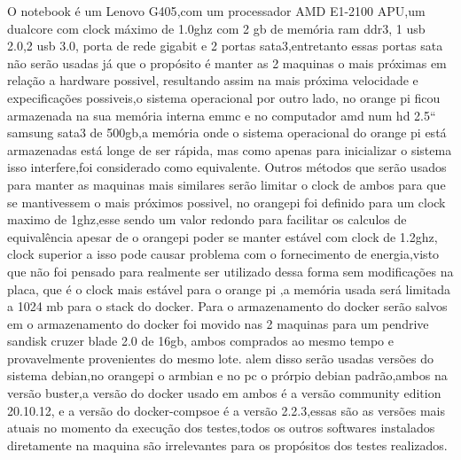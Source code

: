 \documentclass[
	12pt,				%
	openright,			%
	oneside,			%
	a4paper,			%
	english,			%
	french,				%
	spanish,			%
	brazil,				%
	]{abntex2}
\begin{document}
O notebook é um Lenovo G405\cite{G405},com um processador AMD E1-2100 \cite{E1} APU,um dualcore com clock máximo de 1.0ghz com 2 gb de memória ram ddr3, 1 usb 2.0,2 usb 3.0, 
porta de rede gigabit e 2 portas sata3,entretanto essas portas sata não serão usadas já que o propósito é manter as 2 maquinas o mais próximas em relação a hardware possivel,
resultando assim na mais próxima velocidade e expecificações possiveis,o sistema operacional por outro lado,
no orange pi ficou armazenada na sua memória interna emmc e no computador amd num hd 2.5`` samsung sata3 de 500gb,a memória onde o sistema operacional do orange pi está armazenadas está longe de ser rápida,
mas como apenas para inicializar o sistema isso interfere,foi considerado como equivalente.\newline
Outros métodos que serão usados para manter as maquinas mais similares serão limitar o clock de ambos para que se mantivessem o mais próximos possivel,
no orangepi foi definido para um clock maximo de 1ghz,esse sendo um valor redondo para facilitar os calculos de equivalência apesar de o orangepi poder se manter estável com clock de 1.2ghz,
clock superior a isso pode causar problema com o fornecimento de energia,visto que não foi pensado para realmente ser utilizado dessa forma sem modificações na placa,
que é o clock mais estável para o orange pi ,a memória usada será limitada a 1024 mb para o stack do docker.
Para o armazenamento do docker serão salvos em o armazenamento do docker foi movido nas 2 maquinas para um pendrive sandisk cruzer blade 2.0 de 16gb,
ambos comprados ao mesmo tempo e provavelmente provenientes do mesmo lote.\newline
alem disso serão usadas versões do sistema debian,no orangepi o armbian e no pc o prórpio debian padrão,ambos na versão buster,a versão do docker usado em ambos é a versão community edition 20.10.12,
e a versão do docker-compsoe é a versão 2.2.3,essas são as versões mais atuais no momento da execução dos testes,todos os outros softwares instalados diretamente na maquina são irrelevantes para os propósitos dos testes realizados.
\end{document}
